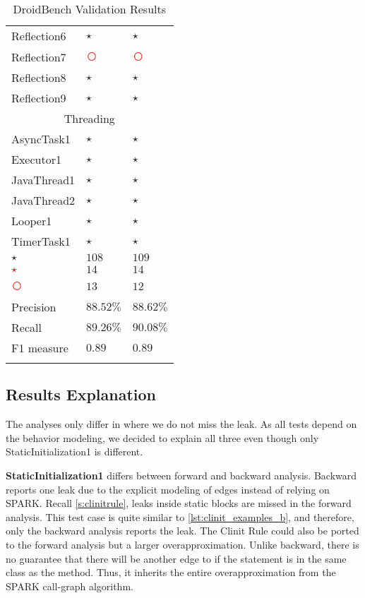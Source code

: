 \documentclass[../draft.tex]{subfiles}
\newcommand{\fp}{{\fontfamily{cmr}\selectfont\textcolor{white}{\textcircled{\textcolor{red}{$\star$}}}}}
\newcommand{\fn}{{\fontfamily{cmr}\selectfont\textcolor{red}{\textcircled{ }}}}
\newcommand{\tp}[0]{{\fontfamily{cmr}\selectfont\textcircled{$\star$}}}
\newcommand{\tsub}[1]{\multicolumn{3}{c}{#1}\\\hline}
\begin{document}
\begin{longtable}{l | l | l}
        Reflection6 & \tp & \tp\\
        Reflection7 & \fn & \fn\\
        Reflection8 & \tp & \tp\\
        Reflection9 & \tp & \tp\\
        \hline
        \tsub{Threading}
        AsyncTask1 & \tp & \tp\\
        Executor1 & \tp & \tp\\
        JavaThread1 & \tp & \tp\\
        JavaThread2 & \tp & \tp\\
        Looper1 & \tp & \tp\\
        TimerTask1 & \tp & \tp\\
        \hhline  %
        \tp &$ 108 $&$ 109 $\\
        \fp &$ 14 $&$ 14 $\\
        \fn &$ 13 $&$ 12 $\\
        Precision & $ 88.52 \%$ & $ 88.62 \%$\\
        Recall & $ 89.26 \% $ & $ 90.08 \%$\\
        F1 measure & $ 0.89 $ & $ 0.89 $\\
        \caption{DroidBench Validation Results}
        \label{t:droidbenchvalidation}
    \end{longtable}

    \subsection{Results Explanation}
    The analyses only differ in  where we do not miss the leak. 
    As all  tests depend on the  behavior modeling, we decided to explain all three even though only StaticInitialization1 is different.

    \textbf{StaticInitialization1} differs between forward and backward analysis. 
    Backward reports one leak due to the explicit modeling of  edges instead of relying on SPARK. 
    Recall \autoref{s:clinitrule}, leaks inside static blocks are missed in the forward analysis. 
    This test case is quite similar to \autoref{lst:clinit_examples_b}, and therefore, only the backward analysis reports the leak. 
    The Clinit Rule could also be ported to the forward analysis but a larger overapproximation. 
    Unlike backward, there is no guarantee that there will be another edge to  if the statement is in the same class as the  method.
    Thus, it inherits the entire overapproximation from the SPARK call-graph algorithm.
    
\end{document}

